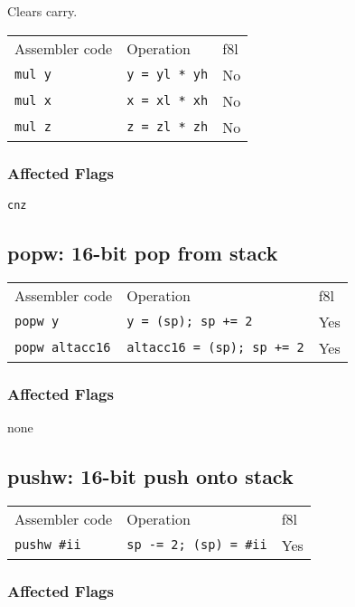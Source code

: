 \documentclass{book}
\begin{document}
Clears carry.

\begin{tabular}{l l l}
Assembler code & Operation            & f8l \\
\texttt{mul y} & \texttt{y = yl * yh} & No \\
\texttt{mul x} & \texttt{x = xl * xh} & No \\
\texttt{mul z} & \texttt{z = zl * zh} & No \\
\end{tabular}

\subsubsection*{Affected Flags}

\texttt{cnz}


\subsection{popw: 16-bit pop from stack}

\begin{tabular}{l l l}
Assembler code         & Operation                         & f8l \\
\texttt{popw y}        & \texttt{y = (sp); sp += 2}        & Yes \\
\texttt{popw altacc16} & \texttt{altacc16 = (sp); sp += 2} & Yes \\
\end{tabular}

\subsubsection*{Affected Flags}

none


\subsection{pushw: 16-bit push onto stack}

\begin{tabular}{l l l}
Assembler code      & Operation                     & f8l \\
\texttt{pushw \#ii} & \texttt{sp -= 2; (sp) = \#ii} & Yes \\
\end{tabular}

\subsubsection*{Affected Flags}
\end{document}
